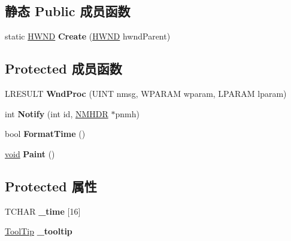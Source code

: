 \subsection*{静态 Public 成员函数}
\begin{DoxyCompactItemize}
\item 
\mbox{\label{struct_clock_window_aa4f02d399b7c87ecd7ea179f1d35e73a}} 
static \hyperlink{interfacevoid}{H\+W\+ND} {\bfseries Create} (\hyperlink{interfacevoid}{H\+W\+ND} hwnd\+Parent)
\end{DoxyCompactItemize}
\subsection*{Protected 成员函数}
\begin{DoxyCompactItemize}
\item 
\mbox{\label{struct_clock_window_a571915695a82c477151928f080690838}} 
L\+R\+E\+S\+U\+LT {\bfseries Wnd\+Proc} (U\+I\+NT nmsg, W\+P\+A\+R\+AM wparam, L\+P\+A\+R\+AM lparam)
\item 
\mbox{\label{struct_clock_window_a8592331665edfbaaca64c8964c85717d}} 
int {\bfseries Notify} (int id, \hyperlink{structtag_n_m_h_d_r}{N\+M\+H\+DR} $\ast$pnmh)
\item 
\mbox{\label{struct_clock_window_a7b775dcc477b73d900c67f718bd60028}} 
bool {\bfseries Format\+Time} ()
\item 
\mbox{\label{struct_clock_window_a55e50fb993b6054e2277f0a90818ed6d}} 
\hyperlink{interfacevoid}{void} {\bfseries Paint} ()
\end{DoxyCompactItemize}
\subsection*{Protected 属性}
\begin{DoxyCompactItemize}
\item 
\mbox{\label{struct_clock_window_a18a48130d33cd3d8ea19fa3862e80209}} 
T\+C\+H\+AR {\bfseries \+\_\+time} \mbox{[}16\mbox{]}
\item 
\mbox{\label{struct_clock_window_ac83ad169f0d73953690f1a0d7cc0a428}} 
\hyperlink{struct_tool_tip}{Tool\+Tip} {\bfseries \+\_\+tooltip}
\end{DoxyCompactItemize}
